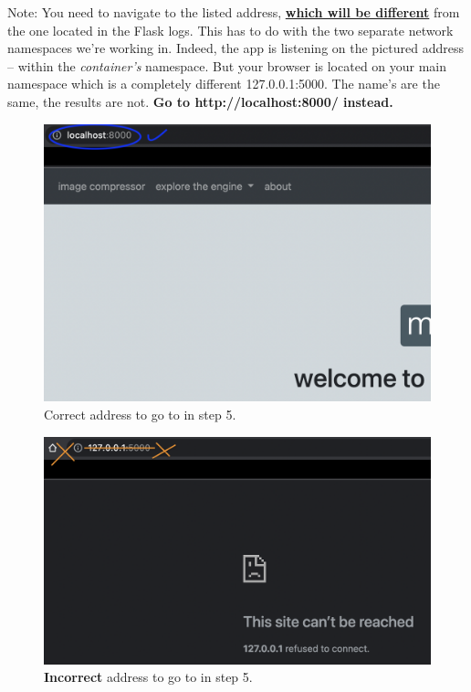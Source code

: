 \documentclass[10pt]{article}
\begin{document}
\begin{multicols*}{2}
Note: You need to navigate to the listed address, \underline{\textbf{which will be different}} from the one located in the Flask logs. This has to do with the two separate network namespaces we're working in. Indeed, the app is listening on the pictured address -- within the \textit{container's} namespace. But your browser is located on your main namespace which is a completely different 127.0.0.1:5000. The name's are the same, the results are not. \textbf{Go to http://localhost:8000/ instead.}

\begin{figure}[H]
    \centering
	\includegraphics[width=\columnwidth]{right.png}
	\caption{Correct address to go to in step 5.}
	\label{fig:fig2}
\end{figure}

\begin{figure}[H]
    \centering
	\includegraphics[width=\columnwidth]{wrong.png}
	\caption{\textbf{Incorrect} address to go to in step 5.}
	\label{fig:fig3}
\end{figure}


\end{multicols*}
\end{document}
